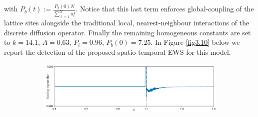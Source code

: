 \documentclass[../main.tex]{subfiles}
\begin{document}
with $P_{b}(t):=\frac{P_{b}(0)N}{\sum_{\ell=1}^{N}u_{\ell}^{4}}$. Notice that this last term enforces global-coupling of the lattice sites alongside the traditional local, nearest-neighbour interactions of the discrete diffusion operator.
Finally the remaining homogeneous constants are set to $k=14.1$, $A=0.63$, $P_{i}=0.96$, $P_{b}(0)=7.25$.
In Figure \ref{fig3.10} below we report the detection of the proposed spatio-temporal EWS for this model.
\begin{figure}[H]
    \centering 
    \begin{subfigure}[b]{\textwidth}
        \centering 
        \includegraphics[keepaspectratio, width = \linewidth]{../figures/fig3.9.1.png}
    \end{subfigure}



\end{figure}
\end{document}
